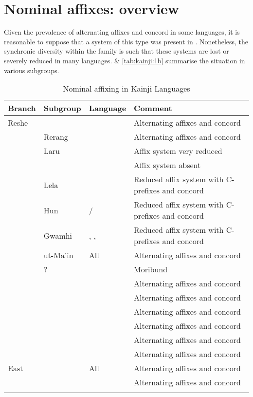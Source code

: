 \documentclass[output=paper]{langsci/langscibook}
\begin{document}
\section{Nominal affixes: overview}

Given the prevalence of alternating affixes and concord in some  languages, it is reasonable to suppose that a system of this type was present in . Nonetheless, the synchronic diversity within the family is such that these systems are lost or severely reduced in many languages.  \& \ref{tab:kainji:1b} summarise the situation in various  subgroups.



\begin{table}
\caption{\label{tab:kainji:1a} Nominal affixing in Kainji Languages}
\begin{tabularx}{\textwidth}{llp{2cm}Q}
\lsptoprule
{Branch}	& {Subgroup}	& {Language}	& {Comment}\\
\midrule
Reshe	& 	& 	& Alternating affixes and concord\\
\tablevspace
{}	& Rerang	& 	& Alternating affixes and concord\\
\tablevspace
	& Laru	& 	& Affix system very reduced\\
\tablevspace
	& 	& 	& Affix system absent\\
\tablevspace
{}	& Lela	& 	& Reduced affix system with C- prefixes and concord\\
\tablevspace
	& Hun	& / 	& Reduced affix system with C- prefixes and concord\\
\tablevspace
	& Gwamhi	& , , 	& Reduced affix system with C- prefixes and concord\\
\tablevspace
	& ut-Ma’in	& All	& Alternating affixes and concord\\
\tablevspace
	& ?	& 	& Moribund\\ 
\tablevspace
{}	& 	& 	& Alternating affixes and concord\\
\tablevspace
	& 	& 	& Alternating affixes and concord\\
\tablevspace
	& 	& 	& Alternating affixes and concord\\
\tablevspace
	& 	& 	& Alternating affixes and concord\\
\tablevspace
	& 	& 	& Alternating affixes and concord\\
\tablevspace
	& 	& 	& Alternating affixes and concord\\ 
\tablevspace
East	& 	& All	& Alternating affixes and concord\\
\tablevspace
	& 	& 	& Alternating affixes and concord\\
\lspbottomrule
\end{tabularx}
\end{table}
\end{document}
